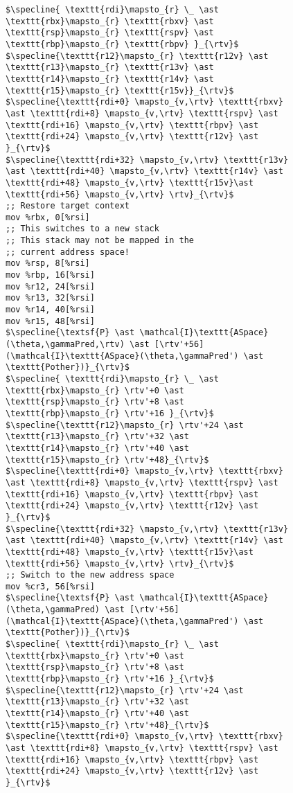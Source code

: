 \begin{figure}
\begin{lstlisting}
$\specline{ \texttt{rdi}\mapsto_{r} \_ \ast \texttt{rbx}\mapsto_{r} \texttt{rbxv} \ast  \texttt{rsp}\mapsto_{r} \texttt{rspv} \ast \texttt{rbp}\mapsto_{r} \texttt{rbpv} }_{\rtv}$
$\specline{\texttt{r12}\mapsto_{r} \texttt{r12v} \ast \texttt{r13}\mapsto_{r} \texttt{r13v} \ast \texttt{r14}\mapsto_{r} \texttt{r14v} \ast \texttt{r15}\mapsto_{r} \texttt{r15v}}_{\rtv}$
$\specline{\texttt{rdi+0} \mapsto_{v,\rtv} \texttt{rbxv} \ast \texttt{rdi+8} \mapsto_{v,\rtv} \texttt{rspv} \ast \texttt{rdi+16} \mapsto_{v,\rtv} \texttt{rbpv} \ast \texttt{rdi+24} \mapsto_{v,\rtv} \texttt{r12v} \ast }_{\rtv}$
$\specline{\texttt{rdi+32} \mapsto_{v,\rtv} \texttt{r13v} \ast \texttt{rdi+40} \mapsto_{v,\rtv} \texttt{r14v} \ast \texttt{rdi+48} \mapsto_{v,\rtv} \texttt{r15v}\ast \texttt{rdi+56} \mapsto_{v,\rtv} \rtv}_{\rtv}$    
;; Restore target context
mov %rbx, 0[%rsi] 
;; This switches to a new stack
;; This stack may not be mapped in the
;; current address space!
mov %rsp, 8[%rsi] 
mov %rbp, 16[%rsi]
mov %r12, 24[%rsi]
mov %r13, 32[%rsi]
mov %r14, 40[%rsi]
mov %r15, 48[%rsi]
$\specline{\textsf{P} \ast \mathcal{I}\texttt{ASpace}(\theta,\gammaPred,\rtv) \ast [\rtv'+56](\mathcal{I}\texttt{ASpace}(\theta,\gammaPred') \ast \texttt{Pother})}_{\rtv}$
$\specline{ \texttt{rdi}\mapsto_{r} \_ \ast \texttt{rbx}\mapsto_{r} \rtv'+0 \ast  \texttt{rsp}\mapsto_{r} \rtv'+8 \ast \texttt{rbp}\mapsto_{r} \rtv'+16 }_{\rtv}$
$\specline{\texttt{r12}\mapsto_{r} \rtv'+24 \ast \texttt{r13}\mapsto_{r} \rtv'+32 \ast \texttt{r14}\mapsto_{r} \rtv'+40 \ast \texttt{r15}\mapsto_{r} \rtv'+48}_{\rtv}$
$\specline{\texttt{rdi+0} \mapsto_{v,\rtv} \texttt{rbxv} \ast \texttt{rdi+8} \mapsto_{v,\rtv} \texttt{rspv} \ast \texttt{rdi+16} \mapsto_{v,\rtv} \texttt{rbpv} \ast \texttt{rdi+24} \mapsto_{v,\rtv} \texttt{r12v} \ast }_{\rtv}$
$\specline{\texttt{rdi+32} \mapsto_{v,\rtv} \texttt{r13v} \ast \texttt{rdi+40} \mapsto_{v,\rtv} \texttt{r14v} \ast \texttt{rdi+48} \mapsto_{v,\rtv} \texttt{r15v}\ast \texttt{rdi+56} \mapsto_{v,\rtv} \rtv}_{\rtv}$    
;; Switch to the new address space
mov %cr3, 56[%rsi]
$\specline{\textsf{P} \ast \mathcal{I}\texttt{ASpace}(\theta,\gammaPred) \ast [\rtv'+56](\mathcal{I}\texttt{ASpace}(\theta,\gammaPred') \ast \texttt{Pother})}_{\rtv}$
$\specline{ \texttt{rdi}\mapsto_{r} \_ \ast \texttt{rbx}\mapsto_{r} \rtv'+0 \ast  \texttt{rsp}\mapsto_{r} \rtv'+8 \ast \texttt{rbp}\mapsto_{r} \rtv'+16 }_{\rtv}$
$\specline{\texttt{r12}\mapsto_{r} \rtv'+24 \ast \texttt{r13}\mapsto_{r} \rtv'+32 \ast \texttt{r14}\mapsto_{r} \rtv'+40 \ast \texttt{r15}\mapsto_{r} \rtv'+48}_{\rtv}$
$\specline{\texttt{rdi+0} \mapsto_{v,\rtv} \texttt{rbxv} \ast \texttt{rdi+8} \mapsto_{v,\rtv} \texttt{rspv} \ast \texttt{rdi+16} \mapsto_{v,\rtv} \texttt{rbpv} \ast  \texttt{rdi+24} \mapsto_{v,\rtv} \texttt{r12v} \ast }_{\rtv}$

\end{lstlisting}
\end{figure}
